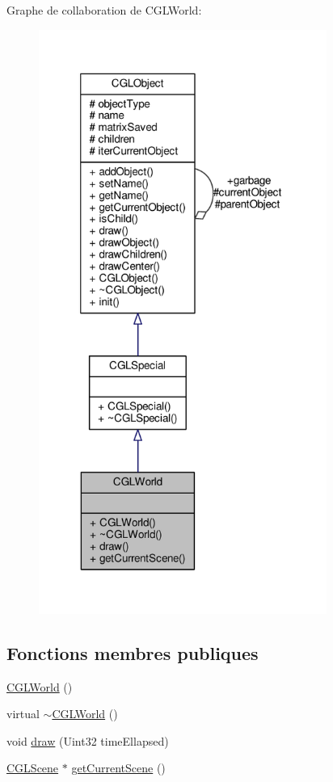 Graphe de collaboration de C\-G\-L\-World\-:\nopagebreak
\begin{figure}[H]
\begin{center}
\leavevmode
\includegraphics[width=267pt]{d4/d24/class_c_g_l_world__coll__graph}
\end{center}
\end{figure}
\subsection*{Fonctions membres publiques}
\begin{DoxyCompactItemize}
\item 
\hyperlink{class_c_g_l_world_ad7d5968c14ea7de0e3be65cdeb588eb1}{C\-G\-L\-World} ()
\item 
virtual \hyperlink{class_c_g_l_world_ae7c2a844552c239ff7ffeec468a7e15e}{$\sim$\-C\-G\-L\-World} ()
\item 
void \hyperlink{class_c_g_l_world_a7dd174b6096cb7c798f7b4518e4842dc}{draw} (Uint32 time\-Ellapsed)
\item 
\hyperlink{class_c_g_l_scene}{C\-G\-L\-Scene} $\ast$ \hyperlink{class_c_g_l_world_a266821b98f90eae32b670ff4def8b948}{get\-Current\-Scene} ()
\end{DoxyCompactItemize}
